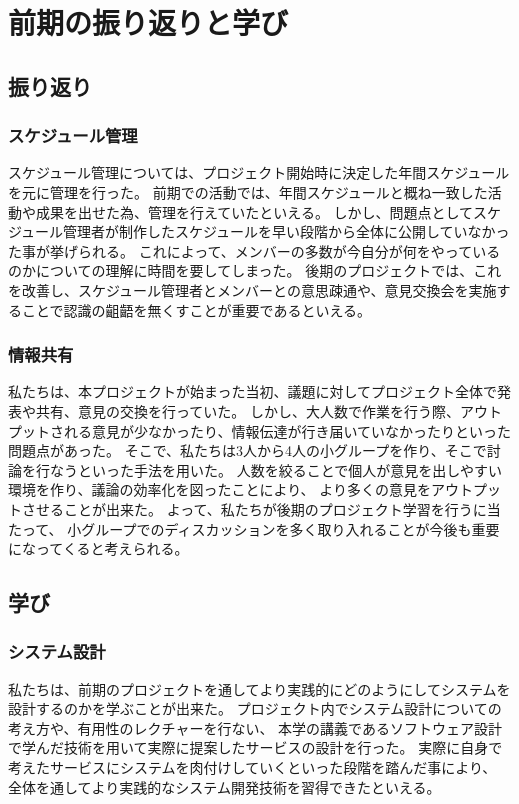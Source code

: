 \documentclass[11pt,papersize]{jsbook}
\begin{document}
\chapter{前期の振り返りと学び}

\section{振り返り}

\subsection{スケジュール管理}
 スケジュール管理については、プロジェクト開始時に決定した年間スケジュールを元に管理を行った。
前期での活動では、年間スケジュールと概ね一致した活動や成果を出せた為、管理を行えていたといえる。
しかし、問題点としてスケジュール管理者が制作したスケジュールを早い段階から全体に公開していなかった事が挙げられる。
これによって、メンバーの多数が今自分が何をやっているのかについての理解に時間を要してしまった。
後期のプロジェクトでは、これを改善し、スケジュール管理者とメンバーとの意思疎通や、意見交換会を実施することで認識の齟齬を無くすことが重要であるといえる。

\subsection{情報共有}
 私たちは、本プロジェクトが始まった当初、議題に対してプロジェクト全体で発表や共有、意見の交換を行っていた。
しかし、大人数で作業を行う際、アウトプットされる意見が少なかったり、情報伝達が行き届いていなかったりといった問題点があった。
そこで、私たちは3人から4人の小グループを作り、そこで討論を行なうといった手法を用いた。
人数を絞ることで個人が意見を出しやすい環境を作り、議論の効率化を図ったことにより、
より多くの意見をアウトプットさせることが出来た。
よって、私たちが後期のプロジェクト学習を行うに当たって、
小グループでのディスカッションを多く取り入れることが今後も重要になってくると考えられる。

\section{学び}

\subsection{システム設計}
 私たちは、前期のプロジェクトを通してより実践的にどのようにしてシステムを設計するのかを学ぶことが出来た。
プロジェクト内でシステム設計についての考え方や、有用性のレクチャーを行ない、
本学の講義であるソフトウェア設計で学んだ技術を用いて実際に提案したサービスの設計を行った。
実際に自身で考えたサービスにシステムを肉付けしていくといった段階を踏んだ事により、
全体を通してより実践的なシステム開発技術を習得できたといえる。
\end{document}
